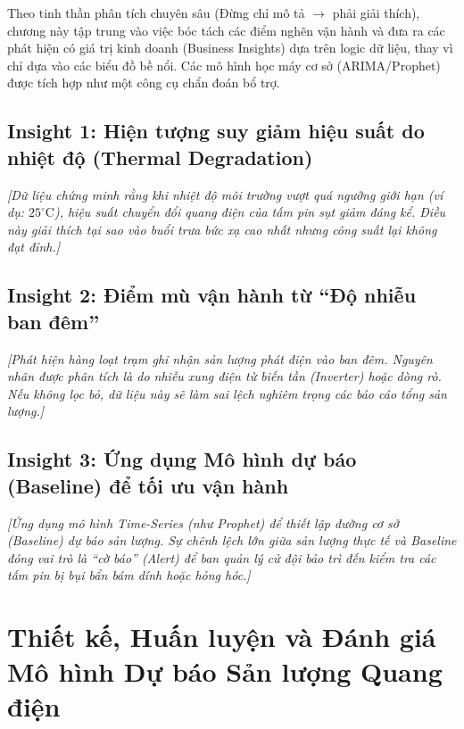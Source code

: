\documentclass[12pt, a4paper]{report}
\begin{document}
Theo tinh thần phân tích chuyên sâu (Đừng chỉ mô tả $\rightarrow$ phải giải thích), chương này tập trung vào việc bóc tách các điểm nghẽn vận hành và đưa ra các phát hiện có giá trị kinh doanh (Business Insights) dựa trên logic dữ liệu, thay vì chỉ dựa vào các biểu đồ bề nổi. Các mô hình học máy cơ sở (ARIMA/Prophet) được tích hợp như một công cụ chẩn đoán bổ trợ.

\section{Insight 1: Hiện tượng suy giảm hiệu suất do nhiệt độ (Thermal Degradation)}
\textit{[Dữ liệu chứng minh rằng khi nhiệt độ môi trường vượt quá ngưỡng giới hạn (ví dụ: $25^\circ\text{C}$), hiệu suất chuyển đổi quang điện của tấm pin sụt giảm đáng kể. Điều này giải thích tại sao vào buổi trưa bức xạ cao nhất nhưng công suất lại không đạt đỉnh.]}

\section{Insight 2: Điểm mù vận hành từ ``Độ nhiễu ban đêm''}
\textit{[Phát hiện hàng loạt trạm ghi nhận sản lượng phát điện vào ban đêm. Nguyên nhân được phân tích là do nhiễu xung điện từ biến tần (Inverter) hoặc dòng rò. Nếu không lọc bỏ, dữ liệu này sẽ làm sai lệch nghiêm trọng các báo cáo tổng sản lượng.]}

\section{Insight 3: Ứng dụng Mô hình dự báo (Baseline) để tối ưu vận hành}
\textit{[Ứng dụng mô hình Time-Series (như Prophet) để thiết lập đường cơ sở (Baseline) dự báo sản lượng. Sự chênh lệch lớn giữa sản lượng thực tế và Baseline đóng vai trò là ``cờ báo'' (Alert) để ban quản lý cử đội bảo trì đến kiểm tra các tấm pin bị bụi bẩn bám dính hoặc hỏng hóc.]}


\chapter{Thiết kế, Huấn luyện và Đánh giá Mô hình Dự báo Sản lượng Quang điện}
\label{chap:hocmay}
\setcounter{topnumber}{3}
\setcounter{bottomnumber}{2}
\setcounter{totalnumber}{4}
\renewcommand{\topfraction}{0.92}
\renewcommand{\bottomfraction}{0.7}
\renewcommand{\textfraction}{0.06}
\renewcommand{\floatpagefraction}{0.85}

\end{document}
